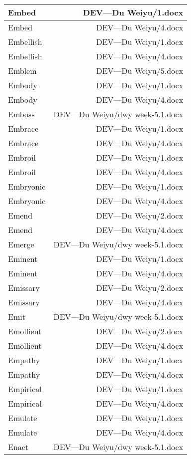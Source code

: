 \documentclass{article}
\begin{document}
\begin{center}
\begin{longtable}{|l|r|}
\hline
Embed  &  DEV---Du Weiyu/1.docx\\  
\hline
Embed  &  DEV---Du Weiyu/4.docx\\  
\hline
Embellish  &  DEV---Du Weiyu/1.docx\\  
\hline
Embellish  &  DEV---Du Weiyu/4.docx\\  
\hline
Emblem  &  DEV---Du Weiyu/5.docx\\  
\hline
Embody  &  DEV---Du Weiyu/1.docx\\  
\hline
Embody  &  DEV---Du Weiyu/4.docx\\  
\hline
Emboss  &  DEV---Du Weiyu/dwy week-5.1.docx\\  
\hline
Embrace  &  DEV---Du Weiyu/1.docx\\  
\hline
Embrace  &  DEV---Du Weiyu/4.docx\\  
\hline
Embroil  &  DEV---Du Weiyu/1.docx\\  
\hline
Embroil  &  DEV---Du Weiyu/4.docx\\  
\hline
Embryonic  &  DEV---Du Weiyu/1.docx\\  
\hline
Embryonic  &  DEV---Du Weiyu/4.docx\\  
\hline
Emend  &  DEV---Du Weiyu/2.docx\\  
\hline
Emend  &  DEV---Du Weiyu/4.docx\\  
\hline
Emerge  &  DEV---Du Weiyu/dwy week-5.1.docx\\  
\hline
Eminent  &  DEV---Du Weiyu/1.docx\\  
\hline
Eminent  &  DEV---Du Weiyu/4.docx\\  
\hline
Emissary  &  DEV---Du Weiyu/2.docx\\  
\hline
Emissary  &  DEV---Du Weiyu/4.docx\\  
\hline
Emit  &  DEV---Du Weiyu/dwy week-5.1.docx\\  
\hline
Emollient  &  DEV---Du Weiyu/2.docx\\  
\hline
Emollient  &  DEV---Du Weiyu/4.docx\\  
\hline
Empathy  &  DEV---Du Weiyu/1.docx\\  
\hline
Empathy  &  DEV---Du Weiyu/4.docx\\  
\hline
Empirical  &  DEV---Du Weiyu/1.docx\\  
\hline
Empirical  &  DEV---Du Weiyu/4.docx\\  
\hline
Emulate  &  DEV---Du Weiyu/1.docx\\  
\hline
Emulate  &  DEV---Du Weiyu/4.docx\\  
\hline
Enact  &  DEV---Du Weiyu/dwy week-5.1.docx\\  

\end{longtable}
\end{center}
\end{document}
